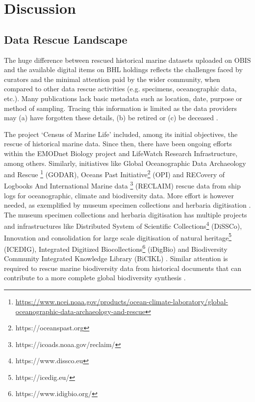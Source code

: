 \section{Discussion}
\label{sec:deco-discussion}

   \subsection{Data Rescue Landscape}
   The huge difference between rescued historical marine datasets uploaded on
OBIS and the available digital items on BHL holdings reflects the challenges
faced by curators and the minimal attention paid by the wider community,
when compared to other data rescue activities (e.g. specimens, oceanographic
data, etc.). Many publications lack basic metadata such as location, date,
purpose or method of sampling. Tracing this information is limited as the data
providers may (a) have forgotten these details, (b) be retired or (c) be
deceased \citep{michener_nongeospatial_1997}.

The project ‘Census of Marine Life’ included, among its initial objectives, the
rescue of historical marine data. Since then, there have been ongoing efforts
within the EMODnet Biology project and LifeWatch Research Infrastructure, among
others. Similarly, initiatives like Global Oceanographic Data Archaeology and
Rescue \footnote{\url{https://www.ncei.noaa.gov/products/ocean-climate-laboratory/global-oceanographic-data-archaeology-and-rescue}}
(GODAR), Oceans Past Initiative\footnote{https://oceanspast.org} (OPI) and
RECovery of Logbooks And International Marine data
\footnote{https://icoads.noaa.gov/reclaim/} (RECLAIM) \citep{wilkinson_recovery_2011}
rescue data from ship logs for oceanographic, climate and biodiversity data.
More effort is however needed, as exemplified by museum specimen collections
and herbaria digitisation \citep{mora_how_2011,wheeler_mapping_2012}.
The museum specimen collections and herbaria digitisation has multiple projects
and infrastructures like Distributed System of Scientific
Collections\footnote{https://www.dissco.eu} (DiSSCo), Innovation and
consolidation for large scale digitisation of natural
heritage\footnote{https://icedig.eu/} (ICEDIG), Integrated Digitized
Biocollections\footnote{https://www.idigbio.org/} (iDigBio) and Biodiversity
Community Integrated Knowledge Library (BiCIKL) \citep{penev_biodiversity_2022}.
Similar attention is required to rescue marine biodiversity data from
historical documents that can contribute to a more complete global biodiversity
synthesis \citep{heberling_j_mason_data_2021}.

